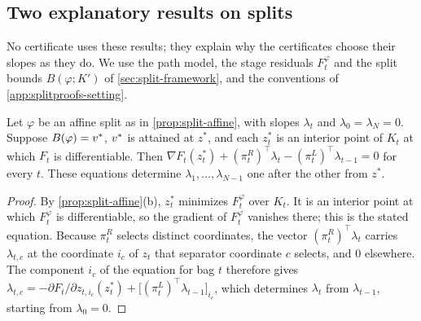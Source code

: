 \subsection{Two explanatory results on splits}\label{app:split-explanatory}

No certificate uses these results; they explain why the certificates choose their slopes as they do.
We use the path model, the stage residuals $F^\varphi_t$ and the split bounds $B(\varphi;K')$ of \cref{sec:split-framework}, and the conventions of \cref{app:splitproofs-setting}.

\begin{proposition}\label{prop:split-forced}
Let $\varphi$ be an affine split as in \cref{prop:split-affine}, with slopes $\lambda_t$ and $\lambda_0=\lambda_N=0$.
Suppose $B(\varphi)=v^{*}$, $v^{*}$ is attained at $z^*$, and each $z^*_t$ is an interior point of $K_t$ at which $F_t$ is differentiable.
Then $\nabla F_t(z^*_t)+(\pi^R_t)^\top\lambda_t-(\pi^L_t)^\top\lambda_{t-1}=0$ for every $t$.
These equations determine $\lambda_1,\dots,\lambda_{N-1}$ one after the other from $z^*$.
\end{proposition}

\begin{proof}
By \cref{prop:split-affine}(b), $z^*_t$ minimizes $F^\varphi_t$ over $K_t$.
It is an interior point at which $F^\varphi_t$ is differentiable, so the gradient of $F^\varphi_t$ vanishes there; this is the stated equation.
Because $\pi^R_t$ selects distinct coordinates, the vector $(\pi^R_t)^\top\lambda_t$ carries $\lambda_{t,c}$ at the coordinate $i_c$ of $z_t$ that separator coordinate $c$ selects, and $0$ elsewhere.
The component $i_c$ of the equation for bag $t$ therefore gives $\lambda_{t,c}=-\partial F_t/\partial z_{t,i_c}(z^*_t)+\bigl[(\pi^L_t)^\top\lambda_{t-1}\bigr]_{i_c}$, which determines $\lambda_t$ from $\lambda_{t-1}$, starting from $\lambda_0=0$.
\end{proof}

